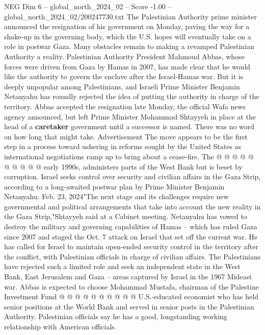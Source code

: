 \begin{textsample}{NEG Dim 6 – global\_north\_2024\_02 – Score -1.00 – global\_north\_2024\_02/200247730.txt}  \label{ex:f6_neg_252}
The Palestinian Authority prime minister announced the resignation of his government on Monday, paving the way for a shake-up in the governing body, which the U.S. hopes will eventually take on a role in postwar Gaza.
Many obstacles remain to making a revamped Palestinian Authority a reality.
Palestinian Authority President Mahmoud Abbas, whose forces were driven from Gaza by Hamas in 2007, has made clear that he would like the authority to govern the enclave after the Israel-Hamas war.
But it is deeply unpopular among Palestinians, and Israeli Prime Minister Benjamin Netanyahu has roundly rejected the idea of putting the authority in charge of the territory.
Abbas accepted the resignation late Monday, the official Wafa news agency announced, but left Prime Minister Mohammad Shtayyeh in place at the head of a \textbf{caretaker} government until a successor is named.
There was no word on how long that might take.
Advertisement The move appears to be the first step in a process toward ushering in reforms sought by the United States as international negotiations ramp up to bring about a cease-fire.
The @ @ @ @ @ @ @ @ @ @ early 1990s, administers parts of the West Bank but is beset by corruption.
Israel seeks control over security and civilian affairs in the Gaza Strip, according to a long-awaited postwar plan by Prime Minister Benjamin Netanyahu.
Feb. 23, 2024"The next stage and its challenges require new governmental and political arrangements that take into account the new reality in the Gaza Strip,"Shtayyeh said at a Cabinet meeting.
Netanyahu has vowed to destroy the military and governing capabilities of Hamas -- which has ruled Gaza since 2007 and staged the Oct. 7 attack on Israel that set off the current war.
He has called for Israel to maintain open-ended security control in the territory after the conflict, with Palestinian officials in charge of civilian affairs.
The Palestinians have rejected such a limited role and seek an independent state in the West Bank, East Jerusalem and Gaza -- areas captured by Israel in the 1967 Mideast war.
Abbas is expected to choose Mohammad Mustafa, chairman of the Palestine Investment Fund @ @ @ @ @ @ @ @ @ @ U.S.-educated economist who has held senior positions at the World Bank and served in senior posts in the Palestinian Authority.
Palestinian officials say he has a good, longstanding working relationship with American officials.

\end{textsample}

